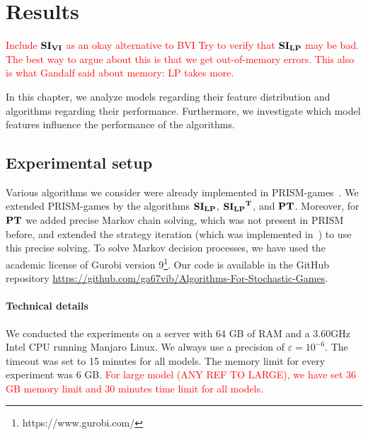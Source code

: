 \chapter{Results} \label{ch:results}

\textcolor{red}{Include $\mathbf{SI_{VI}}$ as an okay alternative to BVI}
\textcolor{red}{Try to verify that $\mathbf{SI_{LP}}$ may be bad. The best way to argue about this is that we get out-of-memory errors. This also is what Gandalf said about memory: LP takes more.}

In this chapter, we analyze models regarding their feature distribution and algorithms regarding their performance.
Furthermore, we investigate which model features influence the performance of the algorithms.



\section{Experimental setup}
Various algorithms we consider were already implemented in PRISM-games~\cite{prismgames3}.
We extended PRISM-games by the algorithms $\mathbf{SI_{LP}}$, $\mathbf{\mathbf{SI_{LP}}^T}$, and $\mathbf{PT}$.
Moreover, for $\mathbf{PT}$ we added precise Markov chain solving, which was not present in PRISM before, and extended the strategy iteration (which was implemented in~\cite{gandalf}) to use this precise solving.
To solve Markov decision processes, we have used the academic license of Gurobi version 9\footnote{https://www.gurobi.com/}. 
Our code is available in the GitHub repository \url{https://github.com/ga67vib/Algorithms-For-Stochastic-Games}.

\subsubsection*{Technical details}
We conducted the experiments on a server with 64 GB of RAM and a 3.60GHz Intel CPU running Manjaro Linux. %
We always use a precision of $\varepsilon=10^{-6}$. The timeout was set to 15 minutes for all models. 
The memory limit for every experiment was 6 GB.
\textcolor{red}{For large model (ANY REF TO LARGE), we have set 36 GB memory limit and 30 minutes time limit for all models.}

